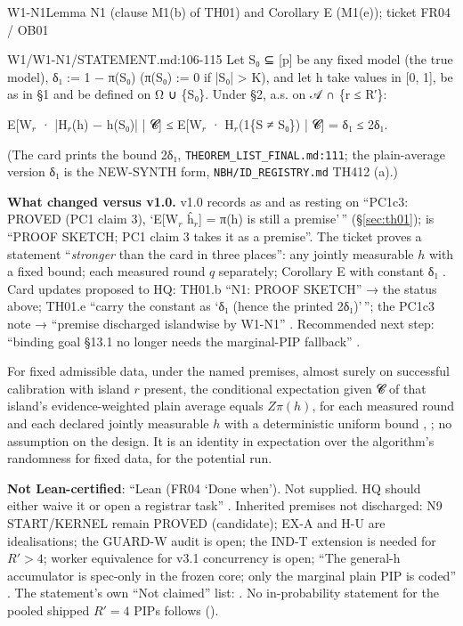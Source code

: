 \begin{card}{W1-N1}{Lemma N1 (clause M1(b) of TH01) and Corollary E (M1(e)); ticket FR04 / OB01}
\begin{stmt}{W1/W1-N1/STATEMENT.md:106-115}
Let S₀ ⊆ [p] be any fixed model (the true model), δ₁ := 1 − π(S₀) (π(S₀) := 0 if |S₀| > K), and let h take values in
[0, 1], be as in §1 and be defined on Ω ∪ \{S₀\}. Under §2, a.s. on 𝒜 ∩ \{r ≤ R′\}:

\medskip
\noindent E[W$_{r}$ · |H$_{r}$(h) − h(S₀)| | 𝓒] ≤ E[W$_{r}$ · H$_{r}$(1\{S ≠ S₀\}) | 𝓒] = δ₁ ≤ 2δ₁.
\medskip

(The card prints the bound 2δ₁, \texttt{THEOREM\_LIST\_FINAL.md:111}; the plain-average version δ₁ is the NEW-SYNTH form,
\texttt{NBH/ID\_REGISTRY.md} TH412 (a).)
\end{stmt}

\textbf{What changed versus v1.0.} v1.0 records  as  and  as resting on ``PC1c3: PROVED (PC1 claim 3), `E[W$_{r}$ ĥ$_{r}$] = π(h) is still a premise'\,'' (\S\ref{sec:th01});  is ``PROOF SKETCH; PC1 claim 3 takes it as a premise''. The ticket proves a statement ``\emph{stronger} than the card in three places'': any jointly measurable $h$ with a fixed bound; each measured round $q$ separately; Corollary E with constant δ₁ . Card updates proposed to HQ: TH01.b ``N1: PROOF SKETCH'' → the status above; TH01.e ``carry the constant as `δ₁ (hence the printed 2δ₁)'\,''; the PC1c3 note → ``premise discharged islandwise by W1-N1'' . Recommended next step: ``binding goal §13.1 no longer needs the marginal-PIP fallback'' .

\begin{plain}For fixed admissible data, under the named premises, almost surely on successful calibration with island $r$ present, the conditional expectation given 𝓒 of that island's evidence-weighted plain average equals $Z\pi(h)$, for each measured round and each declared jointly measurable $h$ with a deterministic uniform bound , ; no assumption on the design. It is an identity in expectation over the algorithm's randomness for fixed data, for the potential run.\end{plain}
\begin{notproved}
\textbf{Not Lean-certified}: ``Lean (FR04 `Done when'). Not supplied. HQ should either waive it or open a registrar task'' . Inherited premises not discharged: N9 START/KERNEL remain PROVED (candidate); EX-A and H-U are idealisations; the GUARD-W audit is open; the IND-T extension is needed for $R'>4$; worker equivalence for v3.1 concurrency is open; ``The general-h accumulator is spec-only in the frozen core; only the marginal plain PIP is coded'' . The statement's own ``Not claimed'' list: . No in-probability statement for the pooled shipped $R'=4$ PIPs follows ().
\end{notproved}
\end{card}

